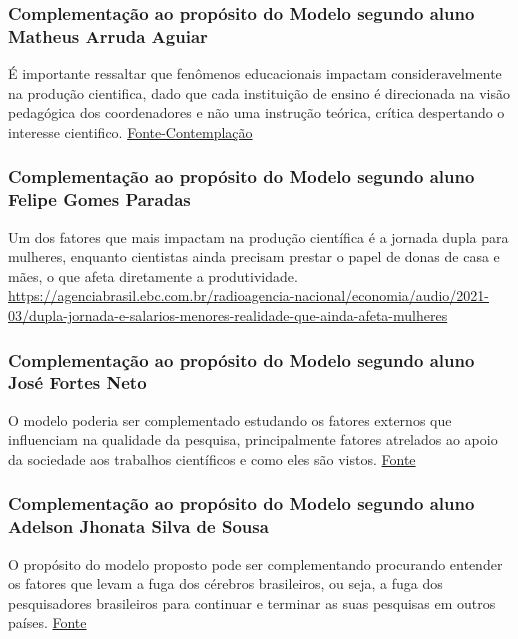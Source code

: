 \subsubsection{Complementação ao propósito do Modelo segundo aluno Matheus Arruda Aguiar}

É importante ressaltar que fenômenos educacionais impactam consideravelmente na produção cientifica, dado que cada instituição de ensino é direcionada na visão pedagógica dos coordenadores e não uma instrução teórica, crítica despertando o interesse cientifico. \href{https://monografias.brasilescola.uol.com.br/pedagogia/influencia-globalizacao-praticas-educativas-e-reformulacao-conteudos.htm}{Fonte-Contemplação}

\subsubsection{Complementação ao propósito do Modelo segundo aluno Felipe Gomes Paradas}

Um dos fatores que mais impactam na produção científica é a jornada dupla para mulheres, enquanto cientistas ainda precisam prestar o papel de donas de casa e mães, o que afeta diretamente a produtividade. \url{https://agenciabrasil.ebc.com.br/radioagencia-nacional/economia/audio/2021-03/dupla-jornada-e-salarios-menores-realidade-que-ainda-afeta-mulheres}

\subsubsection{Complementação ao propósito do Modelo segundo aluno José Fortes Neto}

O modelo poderia ser complementado estudando os fatores externos que influenciam na qualidade da pesquisa, principalmente fatores atrelados ao apoio da sociedade aos trabalhos científicos e como eles são vistos. \href{https://www.periodicosdeminas.ufmg.br/entenda-os-atuais-desafios-das-pesquisas-cientificas/}{Fonte}


\subsubsection{Complementação ao propósito do Modelo segundo aluno Adelson Jhonata Silva de Sousa}
O propósito do modelo proposto pode ser complementando procurando entender os fatores que levam a fuga dos cérebros brasileiros, ou seja, a fuga dos pesquisadores brasileiros para continuar e terminar as suas pesquisas em outros países. \href{https://www.bbc.com/portuguese/brasil-51110626}{Fonte}


